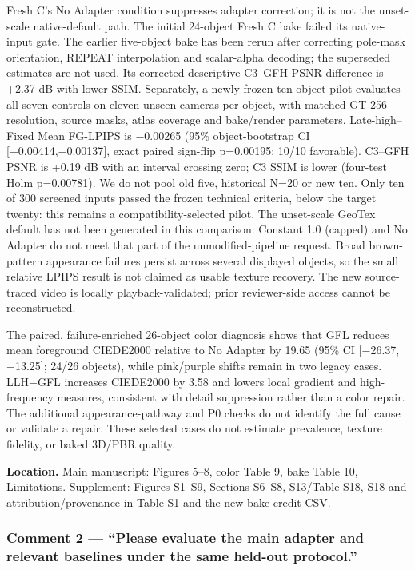 \documentclass[
  10pt,
]{article}
\begin{document}
Fresh C's No Adapter condition suppresses adapter correction; it is not
the unset-scale native-default path. The initial 24-object Fresh C bake
failed its native-input gate. The earlier five-object bake has been
rerun after correcting pole-mask orientation, REPEAT interpolation and
scalar-alpha decoding; the superseded estimates are not used. Its
corrected descriptive C3--GFH PSNR difference is +2.37 dB with lower
SSIM. Separately, a newly frozen ten-object pilot evaluates all seven
controls on eleven unseen cameras per object, with matched GT-256
resolution, source masks, atlas coverage and bake/render parameters.
Late-high--Fixed Mean FG-LPIPS is −0.00265 (95\% object-bootstrap CI
{[}−0.00414,−0.00137{]}, exact paired sign-flip p=0.00195; 10/10
favorable). C3--GFH PSNR is +0.19 dB with an interval crossing zero; C3
SSIM is lower (four-test Holm p=0.00781). We do not pool old five,
historical N=20 or new ten. Only ten of 300 screened inputs passed the
frozen technical criteria, below the target twenty: this remains a
compatibility-selected pilot. The unset-scale GeoTex default has not
been generated in this comparison: Constant 1.0 (capped) and No Adapter
do not meet that part of the unmodified-pipeline request. Broad
brown-pattern appearance failures persist across several displayed
objects, so the small relative LPIPS result is not claimed as usable
texture recovery. The new source-traced video is locally
playback-validated; prior reviewer-side access cannot be reconstructed.

The paired, failure-enriched 26-object color diagnosis shows that GFL
reduces mean foreground CIEDE2000 relative to No Adapter by 19.65 (95\%
CI {[}−26.37, −13.25{]}; 24/26 objects), while pink/purple shifts remain
in two legacy cases. LLH−GFL increases CIEDE2000 by 3.58 and lowers
local gradient and high-frequency measures, consistent with detail
suppression rather than a color repair. The additional
appearance-pathway and P0 checks do not identify the full cause or
validate a repair. These selected cases do not estimate prevalence,
texture fidelity, or baked 3D/PBR quality.

\textbf{Location.} Main manuscript: Figures 5--8, color Table 9, bake
Table 10, Limitations. Supplement: Figures S1--S9, Sections S6--S8,
S13/Table S18, S18 and attribution/provenance in Table S1 and the new
bake credit CSV.

\hypertarget{comment-2-please-evaluate-the-main-adapter-and-relevant-baselines-under-the-same-held-out-protocol.}{%
\subsubsection{Comment 2 --- ``Please evaluate the main adapter and
relevant baselines under the same held-out
protocol.''}\label{comment-2-please-evaluate-the-main-adapter-and-relevant-baselines-under-the-same-held-out-protocol.}}
\end{document}
